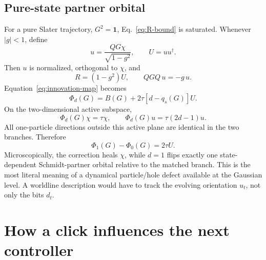 \documentclass[
  aps,prx,twocolumn,superscriptaddress,longbibliography,
  nofootinbib,floatfix
]{revtex4-2}
\newcommand{\Id}{\mathbf{1}}
\theoremstyle{plain}
\theoremstyle{definition}
\begin{document}
\subsection{Pure-state partner orbital}

For a pure Slater trajectory, \(G^2=\Id\), Eq.~\eqref{eq:R-bound} is saturated.
Whenever \(|g|<1\), define
\begin{equation}
 u=\frac{QG\chi}{\sqrt{1-g^2}},
 \qquad U=uu^\dagger.
 \label{eq:partner-orbital}
\end{equation}
Then \(u\) is normalized, orthogonal to \(\chi\), and
\begin{equation}
 R=(1-g^2)U,
 \qquad QGQ\,u=-g\,u.
 \label{eq:pure-R}
\end{equation}
Equation~\eqref{eq:innovation-map} becomes
\begin{equation}
 \Phi_d(G)=B(G)+2\tau[d-q_s(G)]U.
 \label{eq:pure-innovation-map}
\end{equation}
On the two-dimensional active subspace,
\begin{equation}
 \Phi_d(G)\chi=\tau\chi,
 \qquad
 \Phi_d(G)u=\tau(2d-1)u.
 \label{eq:partner-eigenvalues}
\end{equation}
All one-particle directions outside this active plane are identical in the two
branches.  Therefore
\begin{equation}
 \boxed{\Phi_1(G)-\Phi_0(G)=2\tau U.}
 \label{eq:branch-difference}
\end{equation}
Microscopically, the correction heals \(\chi\), while \(d=1\) flips exactly one
state-dependent Schmidt-partner orbital relative to the matched branch.  This
is the most literal meaning of a dynamical particle/hole defect available at
the Gaussian level.  A worldline description would have to track the evolving
orientation \(u_t\), not only the bits \(d_t\).

\section{How a click influences the next controller}
\label{sec:propagation}
\end{document}
